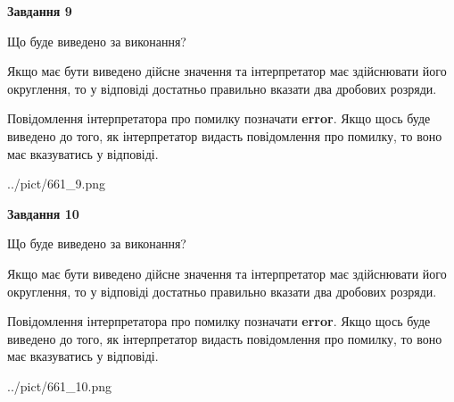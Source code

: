 \documentclass[12pt, ukrainian]{article}
\begin{document}
{\begin {Large}
{\begin {center}\textbf{Завдання 9}\end {center}}\par
Що буде виведено за виконання? \par

Якщо має бути виведено дійсне значення та інтерпретатор має здійснювати його округлення, 
то у відповіді достатньо правильно вказати два дробових розряди.

Повідомлення інтерпретатора про помилку позначати \textbf{error}.
Якщо щось буде виведено до того, як інтерпретатор видасть повідомлення про помилку, 
то воно має вказуватись у відповіді. \par

\begin{center}
	{../pict/661_9.png}
\end{center}
\newpage

{\begin {center}\textbf{Завдання 10}\end {center}}\par
Що буде виведено за виконання? \par

Якщо має бути виведено дійсне значення та інтерпретатор має здійснювати його округлення, 
то у відповіді достатньо правильно вказати два дробових розряди.

Повідомлення інтерпретатора про помилку позначати \textbf{error}.
Якщо щось буде виведено до того, як інтерпретатор видасть повідомлення про помилку, 
то воно має вказуватись у відповіді. \par

\begin{center}
	{../pict/661_10.png}
\end{center}
\newpage

\end {Large}}
\end{document}
